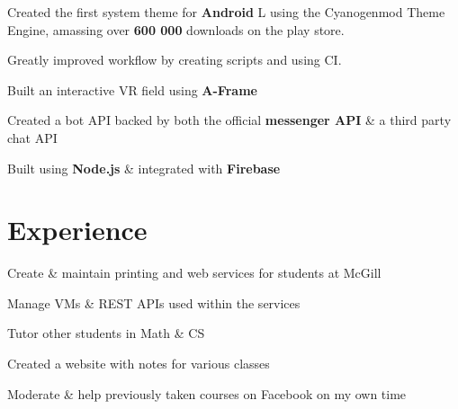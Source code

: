\documentclass[]{allanwang-resume}
\begin{document}
\begin{minipage}[t]{0.66\textwidth}
	\begin{tightemize}
		\item Created the first system theme for \textbf{Android} L using the Cyanogenmod Theme Engine, amassing over \textbf{600 000} downloads on the play store.
		\item Greatly improved workflow by creating scripts and using CI.
	\end{tightemize}

	\begin{tightemize}
		\item Built an interactive VR field using \textbf{A-Frame}
	\end{tightemize}

	\begin{tightemize}
		\item Created a bot API backed by both the official \textbf{messenger API} \& a third party chat API
		\item Built using \textbf{Node.js} \& integrated with \textbf{Firebase}
	\end{tightemize}

	\sectionsep
	\section{Experience}

	\begin{tightemize}
		\item Create \& maintain printing and web services for students at McGill
		\item Manage VMs \& REST APIs used within the services
	\end{tightemize}

	\begin{tightemize}
		\item Tutor other students in Math \& CS
		\item Created a website with notes for various classes
		\item Moderate \& help previously taken courses on Facebook on my own time
	\end{tightemize}

\end{minipage}
\end{document}
